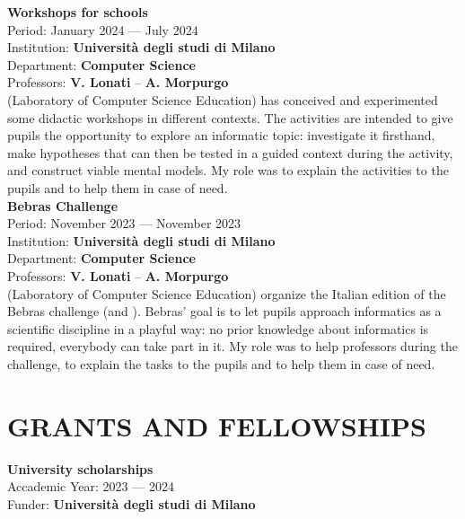 \documentclass[a4paper,9pt]{extarticle}
\begin{document}
\noindent
\textbf{Workshops for schools} \\
Period: January 2024 --- July 2024 \\
Institution: \textbf{Universit\`a degli studi di Milano} \\
Department: \textbf{Computer Science} \\
Professors: \textbf{V. Lonati} -- \textbf{A. Morpurgo} \\
\aladdin (Laboratory of Computer Science Education) has conceived and experimented some didactic workshops in different contexts.  The activities are intended to give pupils the opportunity to explore an informatic topic: investigate it firsthand, make hypotheses that can then be tested in a guided context during the activity, and construct viable mental models. My role was to explain the activities to the pupils and to help them in case of need. \\

\noindent
\textbf{Bebras Challenge} \\
Period: November 2023 --- November 2023 \\
Institution: \textbf{Universit\`a degli studi di Milano} \\
Department: \textbf{Computer Science} \\
Professors: \textbf{V. Lonati} -- \textbf{A. Morpurgo} \\
\aladdin (Laboratory of Computer Science Education) organize the Italian edition of the Bebras challenge (\bebrasit and \bebrasint). Bebras' goal is to let pupils approach informatics as a scientific discipline in a playful way: no prior knowledge about informatics is required, everybody can take part in it.
My role was to help professors during the challenge, to explain the tasks to the pupils and to help them in case of need. \\


\section*{GRANTS AND FELLOWSHIPS}

\noindent
\newline
\textbf{University scholarships} \\
Accademic Year: 2023 --- 2024 \\
Funder: \textbf{Universit\`a degli studi di Milano} \\
\end{document}
